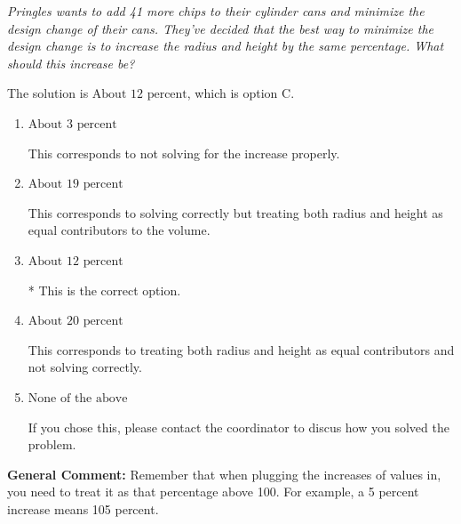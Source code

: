 \documentclass{extbook}[14pt]
\begin{document}
\begin{enumerate}
{\begin{center}
    \textit{ Pringles wants to add 41  more chips to their cylinder cans and minimize the design change of their cans. They've decided that the best way to minimize the design change is to increase the radius and height by the same percentage. What should this increase be? }
\end{center}


The solution is \( \text{About } 12 \text{ percent} \), which is option C.\begin{enumerate}[label=\Alph*.]
\item \( \text{About } 3 \text{ percent} \)

This corresponds to not solving for the increase properly.
\item \( \text{About } 19 \text{ percent} \)

This corresponds to solving correctly but treating both radius and height as equal contributors to the volume.
\item \( \text{About } 12 \text{ percent} \)

* This is the correct option.
\item \( \text{About } 20 \text{ percent} \)

This corresponds to treating both radius and height as equal contributors and not solving correctly.
\item \( \text{None of the above} \)

If you chose this, please contact the coordinator to discus how you solved the problem.
\end{enumerate}

\textbf{General Comment:} Remember that when plugging the increases of values in, you need to treat it as that percentage above 100. For example, a 5 percent increase means 105 percent.
}
\end{enumerate}
\end{document}
